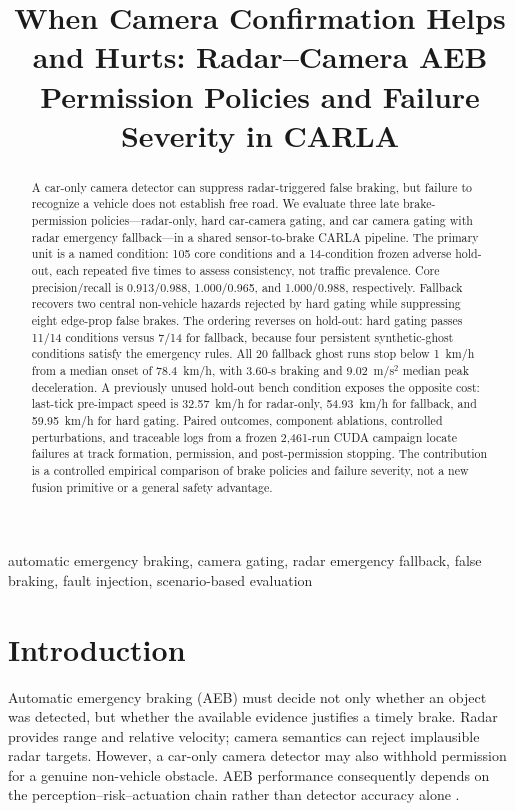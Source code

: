 \documentclass[conference]{IEEEtran}
\title{When Camera Confirmation Helps and Hurts: Radar--Camera AEB Permission Policies and Failure Severity in CARLA}
\author{
\IEEEauthorblockN{Mai Viet Hoang and Duc An Pham}
\IEEEauthorblockA{\textit{Hanoi University of Science and Technology}\\
Hanoi, Vietnam\\hoangmai04222@gmail.com}
}
\begin{document}
\maketitle

\begin{abstract}
A car-only camera detector can suppress radar-triggered false braking, but
failure to recognize a vehicle does not establish free road. We evaluate three
late brake-permission policies---radar-only, hard car-camera gating, and car
camera gating with radar emergency fallback---in a shared sensor-to-brake CARLA
pipeline. The primary unit is a
named condition: 105 core conditions and a 14-condition frozen adverse hold-out,
each repeated five times to assess consistency, not traffic prevalence. Core
precision/recall is 0.913/0.988, 1.000/0.965, and 1.000/0.988, respectively.
Fallback recovers two central non-vehicle hazards rejected by hard gating while
suppressing eight edge-prop false brakes. The ordering reverses on hold-out:
hard gating passes 11/14 conditions versus 7/14 for fallback, because four
persistent synthetic-ghost conditions satisfy the emergency rules. All 20
fallback ghost runs stop below 1~km/h from a median onset of 78.4~km/h, with
3.60-s braking and 9.02~m/s$^2$ median peak deceleration. A previously unused
hold-out bench condition exposes the opposite cost: last-tick pre-impact speed is 32.57~km/h for radar-only,
54.93~km/h for fallback, and 59.95~km/h for hard gating. Paired outcomes,
component ablations, controlled perturbations, and traceable logs from a frozen
2,461-run CUDA campaign locate failures at track formation, permission, and
post-permission stopping. The contribution is a controlled empirical comparison
of brake policies and failure severity, not a new fusion primitive or a general
safety advantage.
\end{abstract}
\begin{IEEEkeywords}
automatic emergency braking, camera gating, radar emergency fallback,
false braking, fault injection, scenario-based evaluation
\end{IEEEkeywords}

\section{Introduction}
Automatic emergency braking (AEB) must decide not only whether an object was
detected, but whether the available evidence justifies a timely brake. Radar
provides range and relative velocity; camera semantics can reject implausible
radar targets. However, a car-only camera detector may also withhold permission
for a genuine non-vehicle obstacle. AEB performance consequently depends on the
perception--risk--actuation chain rather than detector accuracy alone
\cite{yang2022aebreview}.
\end{document}
